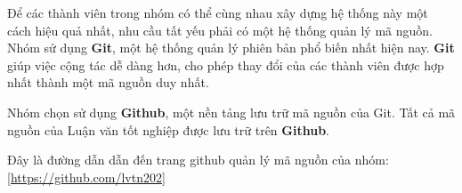 Để các thành viên trong nhóm có thể cùng nhau xây dựng hệ thống này một cách hiệu quả nhất, nhu cầu tất yếu phải có một hệ thống quản lý mã nguồn. Nhóm sử dụng \textbf{Git}, một hệ thống quản lý phiên bản phổ biến nhất hiện nay. \textbf{Git} giúp việc cộng tác dễ dàng hơn, cho phép thay đổi của các thành viên được hợp nhất thành một mã nguồn duy nhất.\par

Nhóm chọn sử dụng \textbf{Github}, một nền tảng lưu trữ mã nguồn của Git. Tất cả mã nguồn của Luận văn tốt nghiệp được lưu trữ trên \textbf{Github}.

Đây là đường dẫn dẫn đến trang github quản lý mã nguồn của nhóm:\\ \href{https://github.com/lvtn202}{[https://github.com/lvtn202]}
